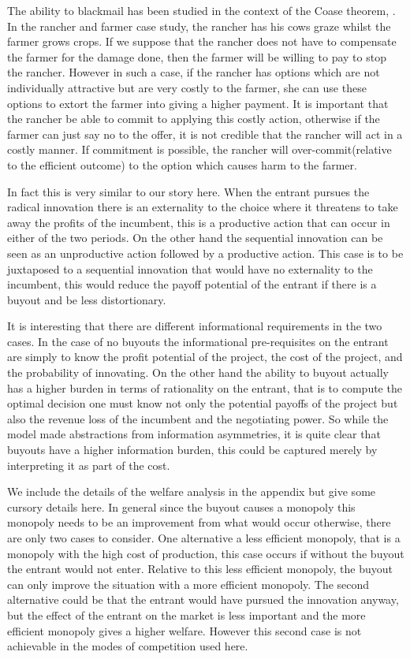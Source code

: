 \documentclass[11pt]{article}
\begin{document}
The ability to blackmail has been studied in the context of the Coase theorem, \cite{Dem}. In the rancher and farmer case study, the rancher has his cows graze whilst the farmer grows crops. If we suppose that the rancher does not have to compensate the farmer for the damage done, then the farmer will be willing to pay to stop the rancher. However in such a case, if the rancher has options which are not individually attractive but are very costly to the farmer, she can use these options to extort the farmer into giving a higher payment. It is important that the rancher be able to commit to applying this costly action, otherwise if the farmer can just say no to the offer, it is not credible that the rancher will act in a costly manner. If commitment is possible, the rancher will over-commit(relative to the efficient outcome) to the option which causes harm to the farmer.

In fact this is very similar to our story here. When the entrant pursues the radical innovation there is an externality to the choice where it threatens to take away the profits of the incumbent, this is a productive action that can occur in either of the two periods. On the other hand the sequential innovation can be seen as an unproductive action followed by a productive action. This case is to be juxtaposed to a sequential innovation that would have no externality to the incumbent, this would reduce the payoff potential of the entrant if there is a buyout and be less distortionary. 

It is interesting that there are different informational requirements in the two cases. In the case of no buyouts the informational pre-requisites on the entrant are simply to know the profit potential of the project, the cost of the project, and the probability of innovating. On the other hand the ability to buyout actually has a higher burden in terms of rationality on the entrant, that is to compute the optimal decision one must know not only the potential payoffs of the project but also the revenue loss of the incumbent and the negotiating power. So while the model made abstractions from information asymmetries, it is quite clear that buyouts have a higher information burden, this could be captured merely by interpreting it as part of the cost. 

We include the details of the welfare analysis in the appendix but give some cursory details here. In general since the buyout causes a monopoly this monopoly needs to be an improvement from what would occur otherwise, there are only two cases to consider. One alternative a less efficient monopoly, that is a monopoly with the high cost of production, this case occurs if without the buyout the entrant would not enter. Relative to this less efficient monopoly, the buyout can only improve the situation with a more efficient monopoly. The second alternative could be that the entrant would have pursued the innovation anyway, but the effect of the entrant on the market is less important and the more efficient monopoly gives a higher welfare. However this second case is not achievable in the modes of competition used here.
\end{document}
